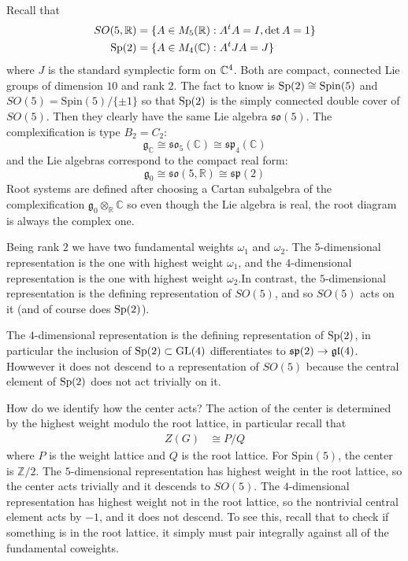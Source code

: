 \documentclass[12pt]{article}
\begin{document}
\begin{solution}
    Recall that \begin{align*}
        SO(5,\mathbb{R}) & = \{A\in M_5(\mathbb{R}) : A^t A = I, \det A = 1\} \\
        \operatorname{Sp}(2)   & = \{A\in M_4(\mathbb{C}) : A^t J A = J\}
    \end{align*} where $J$ is the standard symplectic form on $\mathbb{C}^4$. Both are compact, connected Lie groups of dimension $10$ and rank $2$. The fact to know is $\operatorname{Sp}(2)\cong \mathrm{Spin}(5)$ and $SO(5)=\mathrm{Spin}(5)/\{\pm 1\}$ so that $\operatorname{Sp}(2)$ is the simply connected double cover of $SO(5)$. Then they clearly have the same Lie algebra $\mathfrak{so}(5)$. The complexification is type $B_2=C_2$:
    \[
        \mathfrak{g}_\mathbb{C} \cong \mathfrak{so}_5(\mathbb{C})\cong \mathfrak{sp}_4(\mathbb{C})
    \]
    and the Lie algebras correspond to the compact real form:
    \[
        \mathfrak{g}_0 \cong \mathfrak{so}(5,\mathbb{R})\cong \mathfrak{sp}(2)
    \]
    Root systems are defined after choosing a Cartan subalgebra of the complexification $\mathfrak{g}_0 \otimes_{\mathbb{R}}\mathbb{C}$ so even though the Lie algebra is real, the root diagram is always the complex one.

    Being rank $2$ we have two fundamental weights $\omega_1$ and $\omega_2$. The $5$-dimensional representation is the one with highest weight $\omega_1$, and the $4$-dimensional representation is the one with highest weight $\omega_2$.In contrast, the $5$-dimensional representation is the defining representation of $SO(5)$, and so $SO(5)$ acts on it (and of course does $\operatorname{Sp}(2)$).

    The $4$-dimensional representation is the defining representation of $\operatorname{Sp}(2)$, in particular the inclusion of $\operatorname{Sp}(2) \subset \operatorname{GL}(4)$ differentiates to $\mathfrak{sp}(2) \to \operatorname{\mathfrak{gl}}(4)$. Howwever it does not descend to a representation of $SO(5)$ because the central element of $\operatorname{Sp}(2)$ does not act trivially on it.


    How do we identify how the center acts? The action of the center is determined by the highest weight modulo the root lattice, in particular recall that \begin{align*}
        Z(G) & \cong P/Q
    \end{align*} where $P$ is the weight lattice and $Q$ is the root lattice. For $\mathrm{Spin}(5)$, the center is $\mathbb{Z}/2$. The $5$-dimensional representation has highest weight in the root lattice, so the center acts trivially and it descends to $SO(5)$. The $4$-dimensional representation has highest weight not in the root lattice, so the nontrivial central element acts by $-1$, and it does not descend. To see this, recall that to check if something is in the root lattice, it simply must pair integrally against all of the fundamental coweights.


\end{solution}
\end{document}
